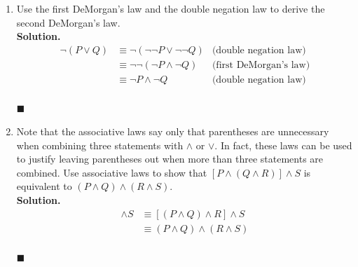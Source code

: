 \documentclass{report}
\newcommand{\sol}{\vspace{1em}\\\textbf{Solution.}\vspace{0.5em}}
\newcommand{\qed}{‎\\‎\hfill$\blacksquare$\vspace{1em}}
\begin{document}
\begin{enumerate}[leftmargin=*]
\begin{enumerate}
              \item $(P \wedge R) \vee[\neg R \wedge(P \vee Q)]$.
                    \sol{}
                    \begin{align*}
                        (P \wedge R) \vee[\neg R \wedge(P \vee Q)] & \equiv (P \wedge R) \vee (\neg R \wedge P) \vee (\neg R \wedge Q) & \text{(distributive law)} \\
                                                                   & \equiv P \wedge (R \vee \neg R) \vee (\neg R \wedge Q)            & \text{(distributive law)} \\
                                                                   & \equiv P \wedge \top \vee (\neg R \wedge Q)                       & \text{(complement law)}   \\
                                                                   & \equiv P \vee (\neg R \wedge Q)                                   & \text{(identity law)}     \\
                    \end{align*} \qed
          \end{enumerate}

    \item Use the first DeMorgan's law and the double negation law to derive the second
          DeMorgan's law. \sol{}
          \begin{align*}
              \neg(P \vee Q) & \equiv \neg(\neg\neg P \vee \neg\neg Q) & \text{(double negation law)}  \\
                             & \equiv \neg\neg(\neg P \wedge \neg Q)   & \text{(first DeMorgan's law)} \\
                             & \equiv \neg P \wedge \neg Q             & \text{(double negation law)}
          \end{align*} \qed

    \item Note that the associative laws say only that parentheses are unnecessary when
          combining three statements with $\wedge$ or $\vee$. In fact, these laws can be
          used to justify leaving parentheses out when more than three statements are
          combined. Use associative laws to show that $[P \wedge(Q \wedge R)] \wedge S$
          is equivalent to $(P \wedge Q) \wedge(R \wedge S)$. \sol{}
          \begin{align*}
              [P \wedge(Q \wedge R)] \wedge S & \equiv [(P \wedge Q) \wedge R] \wedge S \\
                                              & \equiv (P \wedge Q) \wedge (R \wedge S)
          \end{align*} \qed


\end{enumerate}
\end{document}

